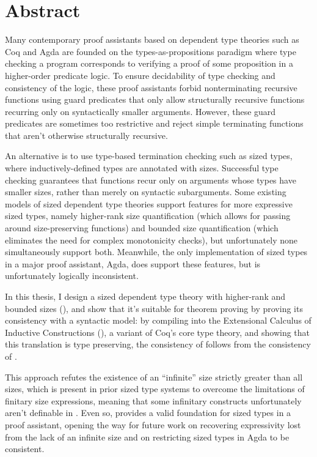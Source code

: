 \chapter{Abstract}

Many contemporary proof assistants based on dependent type theories such as Coq and Agda
are founded on the types-as-propositions paradigm where type checking a program
corresponds to verifying a proof of some proposition in a higher-order predicate logic.
To ensure decidability of type checking and consistency of the logic,
these proof assistants forbid nonterminating recursive functions
using guard predicates that only allow structurally recursive functions
recurring only on syntactically smaller arguments.
However, these guard predicates are sometimes too restrictive
and reject simple terminating functions that aren't otherwise structurally recursive.

An alternative is to use type-based termination checking such as sized types,
where inductively-defined types are annotated with sizes.
Successful type checking guarantees that functions recur only on arguments whose types have smaller sizes,
rather than merely on syntactic subarguments.
Some existing models of sized dependent type theories
support features for more expressive sized types,
namely higher-rank size quantification
(which allows for passing around size-preserving functions)
and bounded size quantification
(which eliminates the need for complex monotonicity checks),
but unfortunately none simultaneously support both.
Meanwhile, the only implementation of sized types in a major proof assistant, Agda,
does support these features, but is unfortunately logically inconsistent.

In this thesis, I design a sized dependent type theory with higher-rank and bounded sizes (\lang),
and show that it's suitable for theorem proving by proving its consistency with a syntactic model:
by compiling \lang into the Extensional Calculus of Inductive Constructions (\CICE),
a variant of Coq's core type theory,
and showing that this translation is type preserving,
the consistency of \lang follows from the consistency of \CICE.

This approach refutes the existence of an ``infinite'' size strictly greater than all sizes,
which is present in prior sized type systems to overcome the limitations of finitary size expressions,
meaning that some infinitary constructs unfortunately aren't definable in \lang.
Even so, \lang provides a valid foundation for sized types in a proof assistant,
opening the way for future work on recovering expressivity lost from the lack of an infinite size
and on restricting sized types in Agda to be consistent.